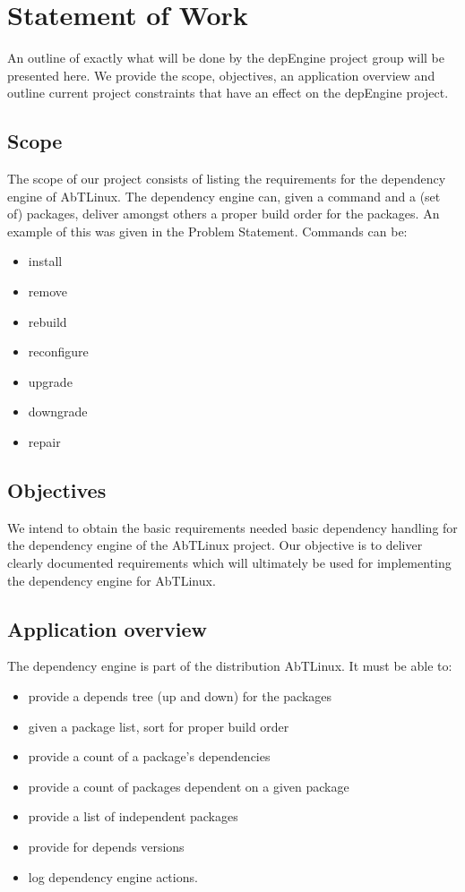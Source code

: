 \section{Statement of Work}
An outline of exactly what will be done by the depEngine project group will be presented here. We provide the scope, objectives, an application overview and outline current project constraints that have an effect on the depEngine project.

\subsection{Scope}
The scope of our project consists of listing the requirements for the dependency engine of AbTLinux. The dependency engine can, given a command and a (set of) packages, deliver amongst others a proper build order for the packages. An example of this was given in the Problem Statement. Commands can be:

\begin{itemize}
  \item install
  \item remove
  \item rebuild
  \item reconfigure
  \item upgrade
  \item downgrade
  \item repair
 \end{itemize}

\subsection{Objectives}
We intend to obtain the basic requirements needed basic dependency handling for the dependency engine of the AbTLinux project. Our objective is to deliver clearly documented requirements which will ultimately be used for implementing the dependency engine for AbTLinux.

\subsection{Application overview}
The dependency engine is part of the distribution AbTLinux. It must be able to:

\begin{itemize}
  \item provide a depends tree (up and down) for the packages
  \item given a package list, sort for proper build order
  \item provide a count of a package's dependencies
  \item provide a count of packages dependent on a given package
  \item provide a list of independent packages
  \item provide for depends versions
  \item log dependency engine actions.
\end{itemize}

